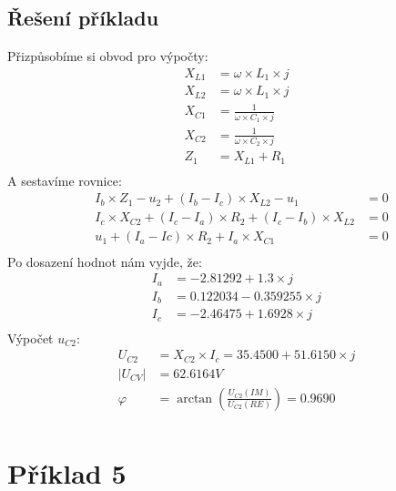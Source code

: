 \documentclass[a4paper, 10pt, fleqn]{article}
\begin{document}
\subsection*{Řešení příkladu}
Přizpůsobíme si obvod pro výpočty:
\begin{align*}
X_{L1} &= \omega \times L_{1} \times j \\
X_{L2} &= \omega \times L_{1} \times j \\
X_{C1} &= \frac{1}{\omega \times C_{1} \times j} \\
X_{C2} &= \frac{1}{\omega \times C_{2} \times j} \\
Z_{1} &= X_{L1} + R_{1} \\
\end{align*}
A sestavíme rovnice:
\begin{align*}
&I_{b} \times Z_{1} - u_{2} + (I_{b} - I_{c}) \times X_{L2} - u_{1} &= 0 \\
&I_{c} \times X_{C2} + (I_{c} - I_{a}) \times R_{2} + (I_{c} - I_{b}) \times X_{L2} &= 0 \\
&u_{1} + (I_{a} - I{c}) \times R_{2} + I_{a} \times X_{C1} &= 0 \\
\end{align*}
Po dosazení hodnot nám vyjde, že:
\begin{align*}
I_{a} &= -2.81292+1.3 \times j \\
I_{b} &= 0.122034 - 0.359255 \times j \\
I_{c} &= -2.46475 + 1.6928 \times j \\
\end{align*}
Výpočet $u_{C2}$:
\begin{align*}
U_{C2} &= X_{C2} \times I_{c} = 35.4500+51.6150 \times j \\
|U_{CV}| &= 62.6164 V \\
\varphi &= \arctan  (\frac{U_{C2}(IM)}{U_{C2}(RE)}) = 0.9690 \\
\end{align*}
\newpage
\section*{Příklad 5}
\end{document}
